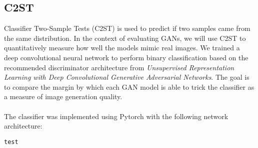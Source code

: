 \documentclass[12pt]{article}
\begin{document}
\begin{multicols*}{2}
        \subsection{C2ST}
        \label{subsec:c2st}
        Classifier Two-Sample Tests (C2ST) is used to predict if two samples came from the same distribution\cite{c2st}.
        In the context of evaluating GANs, we will use C2ST to quantitatively measure how well the models mimic real images.
        We trained a deep convolutional neural network to perform binary classification based on the recommended discriminator architecture from \textit{Unsupervised Representation Learning
with Deep Convolutional Generative Adversarial Networks}\cite{dcgan}.
        The goal is to compare the margin by which each GAN model is able to trick the classifier as a measure of image generation quality.
        \\\\
        The classifier was implemented using Pytorch with the following network architecture:
        \begin{verbatim}
test





\end{verbatim}
\end{multicols*}
\end{document}

